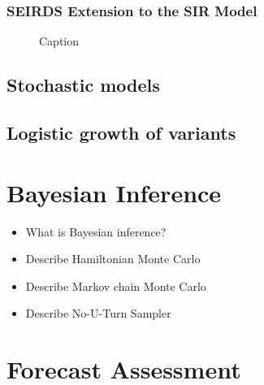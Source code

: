 \subsubsection{SEIRDS Extension to the SIR Model}

\begin{figure}
    \centering
    \caption{Caption}
    \label{fig:ch_2:SEIRDS_diagram}
\end{figure}

\subsection{Stochastic models}


\subsection{Logistic growth of variants}


\section{Bayesian Inference}
\label{sec:bayesian-mcmc}
\begin{itemize}
    \item What is Bayesian inference?
    \item Describe Hamiltonian Monte Carlo %
    \item Describe Markov chain Monte Carlo %
    \item Describe No-U-Turn Sampler %
\end{itemize}

\section{Forecast Assessment}
\label{sec:forecasting_techniques_and_assessment}

